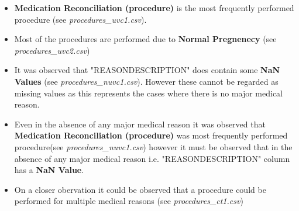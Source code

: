\documentclass[12pt, twosided]{report}  %
\begin{document}
\begin{itemize}

	\item \textbf{Medication Reconciliation (procedure)} is the most frequently performed procedure (see \textit{procedures\_uvc1.csv}).
	
	
	\item Most of the procedures are performed due to \textbf{Normal Pregnenecy} (see \textit{procedures\_uvc2.csv})
	
	\item It was observed that "REASONDESCRIPTION" does contain some \textbf{NaN Values} (see \textit{procedures\_nuvc1.csv}). However these cannot be regarded as missing values as this represents the cases where there is no major medical reason.
	
	\item Even in the absence of any major medical reason it was observed that \textbf{Medication Reconciliation (procedure)} was most frequently performed procedure(see \textit{procedures\_nuvc1.csv}) however it must be observed that in the absence of any major medical reason i.e. "REASONDESCRIPTION" column has a \textbf{NaN Value}.  
	

	\item On a closer obervation it could be observed that a procedure could be performed for multiple medical reasons (see \textit{procedures\_ct1.csv})
	
\end{itemize} 

%
%
\end{document}
